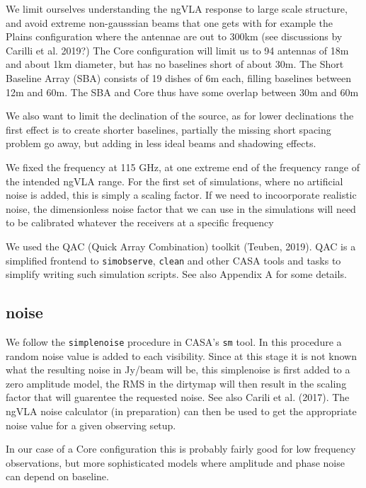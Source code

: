 \documentclass[11pt,twoside]{article}
\begin{document}
We limit ourselves understanding the ngVLA response to large scale
structure, and avoid extreme non-gausssian beams that one gets with
for example the Plains configuration where the antennae are out to
300km (see discussions by Carilli et al. 2019?)  The Core
configuration will limit us to 94 antennas of 18m and about 1km
diameter, but has no baselines short of about 30m.  The Short Baseline
Array (SBA) consists of 19 dishes of 6m each, filling baselines
between 12m and 60m. The SBA and Core thus have some overlap between
30m and 60m



We also want to limit the declination of the source, as for lower
declinations the first effect is to create shorter baselines,
partially the missing short spacing problem go away, but adding in
less ideal beams and shadowing effects.

We fixed the frequency at 115 GHz, at one extreme end of the frequency
range of the intended ngVLA range. For the first set of simulations,
where no artificial noise is added, this is simply a scaling
factor. If we need to incoorporate realistic noise, the dimensionless
noise factor that we can use in the simulations will need to be
calibrated whatever the receivers at a specific frequency



We used the QAC (Quick Array Combination) toolkit (Teuben, 2019). QAC
is a simplified frontend to {\tt simobserve}, {\tt clean} and other
CASA tools and tasks to simplify writing such simulation scripts.  See
also Appendix A for some details.

\subsection{noise}

We follow the {\tt simplenoise} procedure in CASA's {\tt sm} tool.  In
this procedure a random noise value is added to each visibility. Since
at this stage it is not known what the resulting noise in Jy/beam will
be, this simplenoise is first added to a zero amplitude model, the RMS
in the dirtymap will then result in the scaling factor that will
guarentee the requested noise. See also Carili et al. (2017).
The ngVLA noise calculator (in
preparation) can then be used to get the appropriate noise value for a
given observing setup.

In our case of a Core configuration this is probably fairly good for
low frequency observations, but more sophisticated models where
amplitude and phase noise can depend on baseline.
\end{document}
